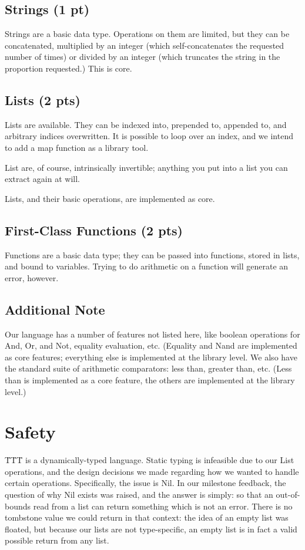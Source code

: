 \documentclass{article}
\begin{document}
\subsection*{Strings (1 pt)}
Strings are a basic data type.  Operations on them are limited, but they can be concatenated, multiplied by an integer (which self-concatenates the requested number of times) or divided by an integer (which truncates the string in the proportion requested.)  This is core.

\subsection*{Lists (2 pts)}
Lists are available.  They can be indexed into, prepended to, appended to, and arbitrary indices overwritten.  It is possible to loop over an index, and we intend to add a map function as a library tool.

List are, of course, intrinsically invertible; anything you put into a list you can extract again at will.

Lists, and their basic operations, are implemented as core.

\subsection*{First-Class Functions (2 pts)}
Functions are a basic data type; they can be passed into functions, stored in lists, and bound to variables.  Trying to do arithmetic on a function will generate an error, however.

\subsection*{Additional Note}
Our language has a number of features not listed here, like boolean operations for And, Or, and Not, equality evaluation, etc.  (Equality and Nand are implemented as core features; everything else is implemented at the library level.  We also have the standard suite of arithmetic comparators: less than, greater than, etc.  (Less than is implemented as a core feature, the others are implemented at the library level.)

\section*{Safety}

\"T\"T\"T is a dynamically-typed language.  Static typing is infeasible due to our List operations, and the design decisions we made regarding how we wanted to handle certain operations.  Specifically, the issue is Nil.  In our milestone feedback, the question of why Nil exists was raised, and the answer is simply: so that an out-of-bounds read from a list can return something which is not an error.  There is no tombstone value we could return in that context: the idea of an empty list was floated, but because our lists are not type-specific, an empty list is in fact a valid possible return from any list.
\end{document}
